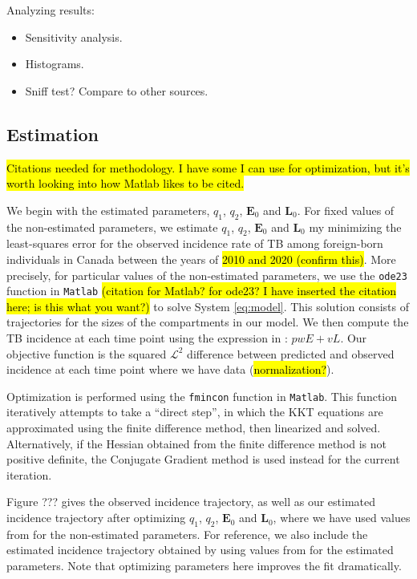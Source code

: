 \documentclass[sn-mathphys,Numbered]{sn-jnl}%
\newcommand{\cE}{\mathbf{E}}
\newcommand{\cL}{\mathbf{L}}
\theoremstyle{thmstyleone}%
\theoremstyle{thmstyletwo}%
\theoremstyle{thmstylethree}%
\begin{document}
Analyzing results:
\begin{itemize}
    \item Sensitivity analysis.
    \item Histograms.
    \item Sniff test?  Compare to other sources.
\end{itemize}

\subsection{Estimation}
\label{sec:estimation}
\hl{Citations needed for methodology. I have some I can use for optimization, but it's worth looking into how Matlab likes to be cited.}

We begin with the estimated parameters, $q_1$, $q_2$, $\cE_0$ and $\cL_0$. For fixed values of the non-estimated parameters, we estimate $q_1$, $q_2$, $\cE_0$ and $\cL_0$ my minimizing the least-squares error for the observed incidence rate of TB among foreign-born individuals in Canada between the years of \hl{2010 and 2020 (confirm this)}. More precisely, for particular values of the non-estimated parameters, we use the \texttt{ode23} function in \texttt{Matlab} \hl{(citation for Matlab? for ode23? I have inserted the citation here; is this what you want?)} \cite{TheMathWorksInc.2022MATLABR2022b} to solve System \ref{eq:model}. This solution consists of trajectories for the sizes of the compartments in our model. We then compute the TB incidence at each time point using the expression in \citet{Guo2011PersistentLatency}: $pwE +vL$. Our objective function is the squared $\mathcal{L}^2$ difference between predicted and observed incidence at each time point where we have data (\hl{normalization?}). 

Optimization is performed using the \texttt{fmincon} function in \texttt{Matlab}. This function iteratively attempts to take a ``direct step'', in which the KKT equations are approximated using the finite difference method, then linearized and solved. Alternatively, if the Hessian obtained from the finite difference method is not positive definite, the Conjugate Gradient method is used instead for the current iteration.

Figure ??? gives the observed incidence trajectory, as well as our estimated incidence trajectory after optimizing $q_1$, $q_2$, $\cE_0$ and $\cL_0$, where we have used values from \citet{Guo2011PersistentLatency} for the non-estimated parameters. For reference, we also include the estimated incidence trajectory obtained by using values from \citet{Guo2011PersistentLatency} for the estimated parameters. Note that optimizing parameters here improves the fit dramatically.
\end{document}
